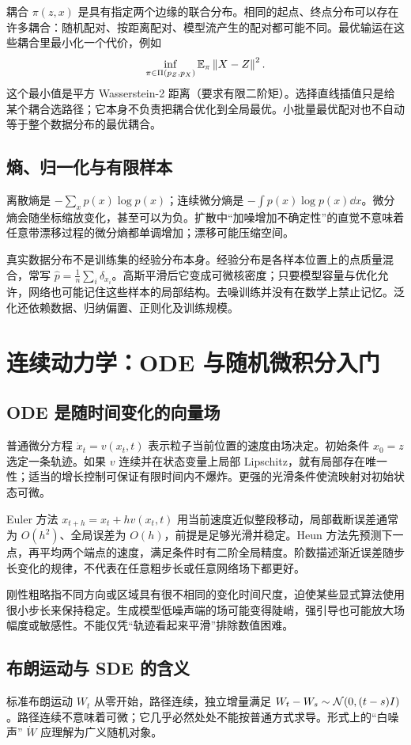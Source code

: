 耦合 $\pi(z,x)$ 是具有指定两个边缘的联合分布。相同的起点、终点分布可以存在许多耦合：随机配对、按距离配对、模型流产生的配对都可能不同。最优输运在这些耦合里最小化一个代价，例如
\begin{equation}
 \inf_{\pi\in\Pi(p_Z,p_X)}\mathbb{E}_\pi\left\lVert X-Z\right\rVert^2.
\end{equation}
这个最小值是平方 Wasserstein-2 距离（要求有限二阶矩）。选择直线插值只是给某个耦合选路径；它本身不负责把耦合优化到全局最优。小批量最优配对也不自动等于整个数据分布的最优耦合。

\section{熵、归一化与有限样本}
离散熵是 $-\sum_xp(x)\log p(x)$；连续微分熵是 $-\int p(x)\log p(x)\dd x$。微分熵会随坐标缩放变化，甚至可以为负。扩散中“加噪增加不确定性”的直觉不意味着任意带漂移过程的微分熵都单调增加；漂移可能压缩空间。

真实数据分布不是训练集的经验分布本身。经验分布是各样本位置上的点质量混合，常写 $\widehat p=\frac1n\sum_i\delta_{x_i}$。高斯平滑后它变成可微核密度；只要模型容量与优化允许，网络也可能记住这些样本的局部结构。去噪训练并没有在数学上禁止记忆。泛化还依赖数据、归纳偏置、正则化及训练规模。

\chapter{连续动力学：ODE 与随机微积分入门}\label{app:stochastic}
\section{ODE 是随时间变化的向量场}
普通微分方程 $\dot x_t=v(x_t,t)$ 表示粒子当前位置的速度由场决定。初始条件 $x_0=z$ 选定一条轨迹。如果 $v$ 连续并在状态变量上局部 Lipschitz，就有局部存在唯一性；适当的增长控制可保证有限时间内不爆炸。更强的光滑条件使流映射对初始状态可微。

Euler 方法 $x_{t+h}=x_t+h v(x_t,t)$ 用当前速度近似整段移动，局部截断误差通常为 $O(h^2)$、全局误差为 $O(h)$，前提是足够光滑并稳定。Heun 方法先预测下一点，再平均两个端点的速度，满足条件时有二阶全局精度。阶数描述渐近误差随步长变化的规律，不代表在任意粗步长或任意网络场下都更好。

刚性粗略指不同方向或区域具有很不相同的变化时间尺度，迫使某些显式算法使用很小步长来保持稳定。生成模型低噪声端的场可能变得陡峭，强引导也可能放大场幅度或敏感性。不能仅凭“轨迹看起来平滑”排除数值困难。

\section{布朗运动与 SDE 的含义}
标准布朗运动 $W_t$ 从零开始，路径连续，独立增量满足 $W_t-W_s\sim\mathcal{N}(0,(t-s)I)$。路径连续不意味着可微；它几乎必然处处不能按普通方式求导。形式上的“白噪声” $\dot W$ 应理解为广义随机对象。

